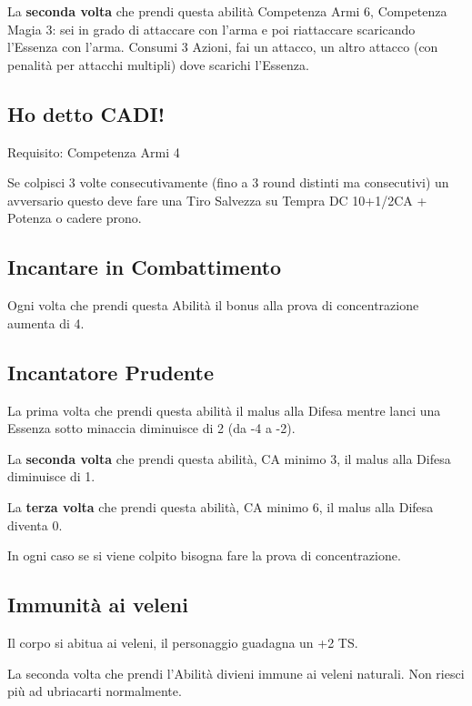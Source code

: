 \documentclass[a4paper,11pt,twoside,openany]{book}
\begin{document}
La \textbf{seconda volta} che prendi questa abilità Competenza Armi 6, Competenza Magia 3: sei in grado di attaccare con l'arma e poi riattaccare scaricando l'Essenza con l'arma. Consumi 3 Azioni, fai un attacco, un altro attacco (con penalità per attacchi multipli) dove scarichi l'Essenza.

\subsection{Ho detto CADI!}

Requisito: Competenza Armi 4

Se colpisci 3 volte consecutivamente (fino a 3 round distinti ma consecutivi) un avversario questo deve fare una Tiro Salvezza su Tempra DC 10+1/2CA + Potenza o cadere prono.

\subsection{Incantare in Combattimento}

Ogni volta che prendi questa Abilità il bonus alla prova di concentrazione aumenta di 4.

\subsection{Incantatore Prudente}

La prima volta che prendi questa abilità il malus alla Difesa mentre lanci una Essenza sotto minaccia diminuisce di 2 (da -4 a -2).

La \textbf{seconda volta} che prendi questa abilità, CA minimo 3, il malus alla Difesa diminuisce di 1.

La \textbf{terza volta} che prendi questa abilità, CA minimo 6, il malus alla Difesa diventa 0.

In ogni caso se si viene colpito bisogna fare la prova di concentrazione.

\subsection{Immunità ai veleni}

Il corpo si abitua ai veleni, il personaggio guadagna un +2 TS.

La seconda volta che prendi l'Abilità divieni immune ai veleni naturali.
Non riesci più ad ubriacarti normalmente.
\end{document}
